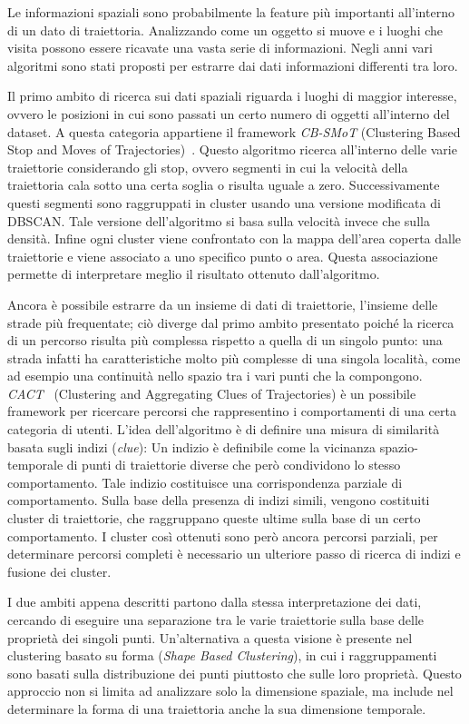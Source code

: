 Le informazioni spaziali sono probabilmente la feature più importanti all'interno di un dato di traiettoria.
Analizzando come un oggetto si muove e i luoghi che visita possono essere ricavate una vasta serie di informazioni.
Negli anni vari algoritmi sono stati proposti per estrarre dai dati informazioni differenti tra loro.

Il primo ambito di ricerca sui dati spaziali riguarda i luoghi di maggior interesse, ovvero le posizioni
in cui sono passati un certo numero di oggetti all'interno del dataset.
A questa categoria appartiene il framework \textit{CB-SMoT} (Clustering Based Stop and Moves of Trajectories)~\cite{palma2008clustering}.
Questo algoritmo ricerca all'interno delle varie traiettorie considerando gli stop, ovvero segmenti in cui la velocità della traiettoria cala sotto una certa soglia o risulta uguale a zero.
Successivamente questi segmenti sono raggruppati in cluster usando una versione modificata di DBSCAN\@.
Tale versione dell'algoritmo si basa sulla velocità invece che sulla densità.
Infine ogni cluster viene confrontato con la mappa dell'area coperta dalle traiettorie e viene associato a uno specifico punto o area.
Questa associazione permette di interpretare meglio il risultato ottenuto dall'algoritmo.


Ancora è possibile estrarre da un insieme di dati di traiettorie, l'insieme delle strade più
frequentate; ciò diverge dal primo ambito presentato poiché la ricerca di un percorso risulta
più complessa rispetto a quella di un singolo punto: una strada infatti ha caratteristiche molto
più complesse di una singola località, come ad esempio una continuità nello spazio tra i vari punti che
la compongono.
\textit{CACT}~\cite{hung2015clustering} (Clustering and Aggregating Clues of Trajectories) è un possibile framework per
ricercare percorsi che rappresentino i comportamenti di una certa categoria di utenti.
L'idea dell'algoritmo è di definire una misura di similarità basata sugli indizi (\textit{clue}):
Un indizio è definibile come la vicinanza spazio-temporale di punti di traiettorie diverse che però condividono lo stesso comportamento.
Tale indizio costituisce una corrispondenza parziale di comportamento.
Sulla base della presenza di indizi simili, vengono costituiti cluster di traiettorie, che raggruppano queste ultime sulla base di un certo comportamento.
I cluster così ottenuti sono però ancora percorsi parziali, per determinare percorsi completi è necessario un ulteriore passo di ricerca di indizi e fusione dei cluster.

I due ambiti appena descritti partono dalla stessa interpretazione dei dati, cercando di eseguire una separazione tra le varie traiettorie sulla base delle proprietà dei singoli punti.
Un'alternativa a questa visione è presente nel clustering basato su forma (\textit{Shape Based Clustering}),
in cui i raggruppamenti sono basati sulla distribuzione dei punti piuttosto che sulle loro proprietà.
Questo approccio non si limita ad analizzare solo la dimensione spaziale, ma include nel determinare la forma di una traiettoria anche la sua dimensione temporale.
